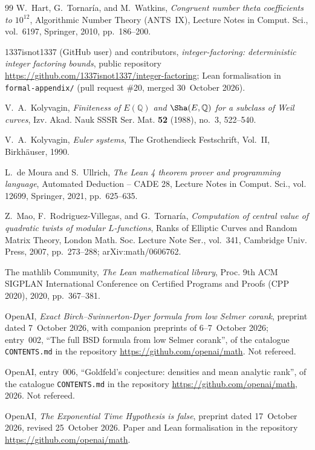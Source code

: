 \documentclass[10pt]{amsart}
\theoremstyle{plain}
\theoremstyle{definition}
\theoremstyle{remark}
\numberwithin{equation}{section}
\begin{document}
\begin{thebibliography}{99}
W.~Hart, G.~Tornar\'ia, and M.~Watkins, \emph{Congruent number theta coefficients to $10^{12}$}, Algorithmic
Number Theory (ANTS~IX), Lecture Notes in Comput. Sci., vol.~6197, Springer, 2010, pp.~186--200.

1337isnot1337 (GitHub user) and contributors, \emph{integer-factoring: deterministic integer factoring bounds},
public repository \url{https://github.com/1337isnot1337/integer-factoring}; Lean formalisation in
\texttt{formal-appendix/} (pull request \#20, merged 30~October 2026).

V.~A.~Kolyvagin, \emph{Finiteness of {$E(\mathbb Q)$} and {$\Sha(E,\mathbb Q)$} for a subclass of {W}eil curves},
Izv. Akad. Nauk SSSR Ser. Mat. \textbf{52} (1988), no.~3, 522--540.

V.~A.~Kolyvagin, \emph{Euler systems}, The Grothendieck Festschrift, Vol.~II, Birkh\"auser, 1990.

L.~de Moura and S.~Ullrich, \emph{The {L}ean 4 theorem prover and programming language}, Automated Deduction --
CADE 28, Lecture Notes in Comput. Sci., vol. 12699, Springer, 2021, pp.~625--635.

Z.~Mao, F.~Rodriguez-Villegas, and G.~Tornar\'ia, \emph{Computation of central value of quadratic twists of
modular {$L$}-functions}, Ranks of Elliptic Curves and Random Matrix Theory, London Math. Soc. Lecture Note
Ser., vol.~341, Cambridge Univ. Press, 2007, pp.~273--288; arXiv:math/0606762.

The mathlib Community, \emph{The {L}ean mathematical library}, Proc. 9th ACM SIGPLAN International Conference on
Certified Programs and Proofs (CPP 2020), 2020, pp.~367--381.

OpenAI, \emph{Exact {B}irch--{S}winnerton-{D}yer formula from low {S}elmer corank}, preprint dated 7~October 2026,
with companion preprints of 6--7~October 2026; entry~002, ``The full BSD formula from low Selmer corank'', of the
catalogue \texttt{CONTENTS.md} in the repository \url{https://github.com/openai/math}. Not refereed.

OpenAI, entry~006, ``Goldfeld's conjecture: densities and mean analytic rank'', of the catalogue
\texttt{CONTENTS.md} in the repository \url{https://github.com/openai/math}, 2026. Not refereed.

OpenAI, \emph{The {E}xponential {T}ime {H}ypothesis is false}, preprint dated 17~October 2026, revised 25~October
2026. Paper and Lean formalisation in the repository \url{https://github.com/openai/math}.


\end{thebibliography}
\end{document}

